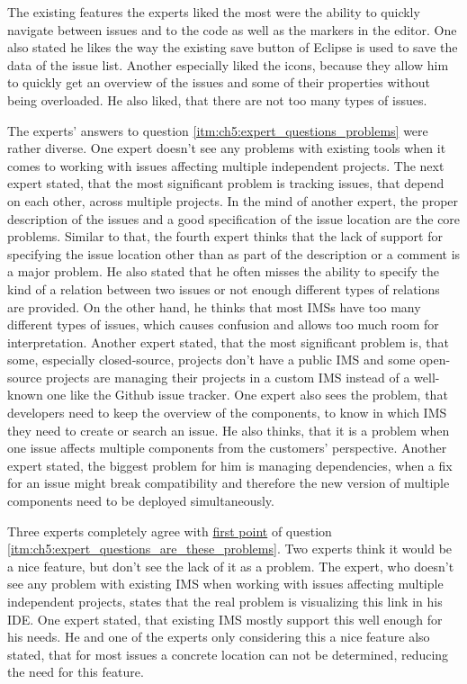 The existing features the experts liked the most were the ability to quickly navigate between issues and to the code as well as the markers in the editor.
One also stated he likes the way the existing save button of \gls{Eclipse} is used to save the data of the issue list.
Another especially liked the icons, because they allow him to quickly get an overview of the issues and some of their properties without being overloaded.
He also liked, that there are not too many types of issues.

The experts' answers to question \ref{itm:ch5:expert_questions_problems} were rather diverse.
One expert doesn't see any problems with existing tools when it comes to working with issues affecting multiple independent projects.
The next expert stated, that the most significant problem is tracking issues, that depend on each other, across multiple projects.
In the mind of another expert, the proper description of the issues and a good specification of the issue location are the core problems.
Similar to that, the fourth expert thinks that the lack of support for specifying the issue location other than as part of the description or a comment is a major problem.
He also stated that he often misses the ability to specify the kind of a relation between two issues or not enough different types of relations are provided.
On the other hand, he thinks that most \glspl{IMS} have too many different types of issues, which causes confusion and allows too much room for interpretation.
Another expert stated, that the most significant problem is, that some, especially closed-source, projects don't have a public \gls{IMS} and some open-source projects are managing their projects in a custom \gls{IMS} instead of a well-known one like the Github issue tracker.
One expert also sees the problem, that developers need to keep the overview of the components, to know in which \gls{IMS} they need to create or search an issue.
He also thinks, that it is a problem when one issue affects multiple components from the customers' perspective.
Another expert stated, the biggest problem for him is managing dependencies, when a fix for an issue might break compatibility and therefore the new version of multiple components need to be deployed simultaneously. 

Three experts completely agree with \hyperref[itm:ch5:expert_questions_are_these_problems_1]{first point} of question \ref{itm:ch5:expert_questions_are_these_problems}.
Two experts think it would be a nice feature, but don't see the lack of it as a problem.
The expert, who doesn't see any problem with existing \gls{IMS} when working with issues affecting multiple independent projects, states that the real problem is visualizing this link in his \gls{IDE}.
One expert stated, that existing \gls{IMS} mostly support this well enough for his needs.
He and one of the experts only considering this a nice feature also stated, that for most issues a concrete location can not be determined, reducing the need for this feature.

